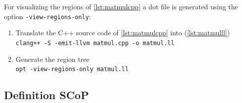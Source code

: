 \begin{sloppypar}
    \noindent
    For visualizing the regions of \autoref{lst:matmulcpp} a dot file is generated using the option \texttt{-view-regions-only}:
\end{sloppypar}
\begin{enumerate}
    \item Translate the C++ source code of \autoref{lst:matmulcpp} into \llvmir (\autoref{lst:matmulll})\\
        \texttt{clang++ -S -emit-llvm matmul.cpp -o matmul.ll}
    \item Generate the region tree\\
        \texttt{opt -view-regions-only matmul.ll}
\end{enumerate}
\subsection{Definition SCoP}\label{subsec:definitionScop}

